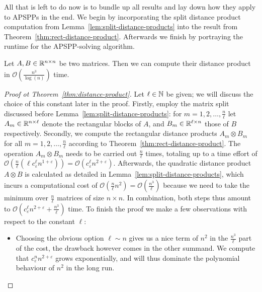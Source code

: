 All that is left to do now is to bundle up all results and lay down how they apply to APSPPs in the end.
We begin by incorporating the split distance product computation from Lemma~\ref{lem:split-distance-products} into the result from Theorem~\ref{thm:rect-distance-product}.
Afterwards we finish by portraying the runtime for the APSPP-solving algorithm.

\begin{theorem}\label{thm:distance-product}
    Let $A, B \in \mathbb{R}^{n \times n}$ be two matrices.
    Then we can compute their distance product in $\mathcal{O}\left( \frac{n^3}{\log(n)} \right)$ time.
\end{theorem}

\begin{proof}[Proof ot Theorem~\ref{thm:distance-product}]
    Let $\ell \in \mathbb{N}$ be given; we will discuss the choice of this constant later in the proof.
    Firstly, employ the matrix split discussed before Lemma~\ref{lem:split-distance-products}: for $m = 1, 2, \dots, \frac{n}{\ell}$ let $A_m \in \mathbb{R}^{n \times \ell}$ denote the rectangular blocks of $A$, and $B_m \in \mathbb{R}^{\ell \times n}$ those of $B$ respectively.
    Secondly, we compute the rectangular distance products $A_m \otimes B_m$ for all $m = 1, 2, \dots, \frac{n}{\ell}$ according to Theorem~\ref{thm:rect-distance-product}.
    The operation $A_m \otimes B_m$ needs to be carried out $\frac{n}{\ell}$ times, totaling up to a time effort of $\mathcal{O}\left( \frac{n}{\ell} \left( \ell c_\varepsilon^\ell n^{1 + \varepsilon} \right) \right) = \mathcal{O}\left( c_\varepsilon^\ell n^{2 + \varepsilon} \right)$.
    Afterwards, the quadratic distance product $A \otimes B$ is calculated as detailed in Lemma~\ref{lem:split-distance-products}, which incurs a computational cost of $\mathcal{O}\left( \frac{n}{\ell} n^2 \right) = \mathcal{O}\left( \frac{n^3}{\ell} \right)$ because we need to take the minimum over $\frac{n}{\ell}$ matrices of size $n \times n$.
    In combination, both steps thus amount to $\mathcal{O}\left( c_\varepsilon^\ell n^{2 + \varepsilon} + \frac{n^3}{\ell} \right)$ time.
    To finish the proof we make a few observations with respect to the constant $\ell$:
    \begin{itemize}
        \item %
            Choosing the obvious option $\ell \sim n$ gives us a nice term of $n^2$ in the $\frac{n^3}{\ell}$ part of the cost, the drawback however comes in the other summand.
            We compute that $c_\varepsilon^n n^{2 + \varepsilon}$ grows exponentially, and will thus dominate the polynomial behaviour of $n^2$ in the long run.

\end{itemize}
\end{proof}
